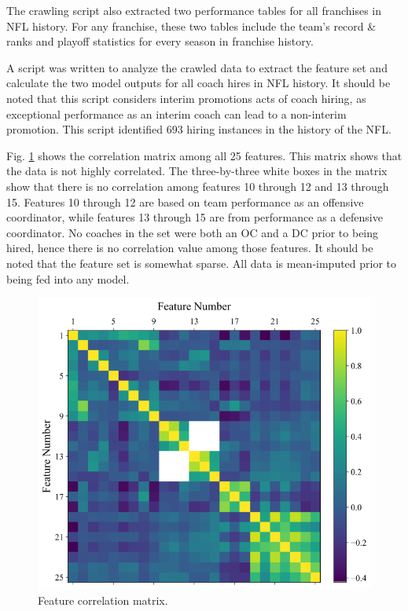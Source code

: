 \documentclass[conference]{IEEEtran}
\begin{document}
The crawling script also extracted two performance tables for all franchises in NFL history. For any franchise, these two tables include the team's record \& ranks and playoff statistics for every season in franchise history.

A script was written to analyze the crawled data to extract the feature set and calculate the two model outputs for all coach hires in NFL history. It should be noted that this script considers interim promotions acts of coach hiring, as exceptional performance as an interim coach can lead to a non-interim promotion. This script identified 693 hiring instances in the history of the NFL.

Fig. \ref{fig1} shows the correlation matrix among all 25 features. This matrix shows that the data is not highly correlated. The three-by-three white boxes in the matrix show that there is no correlation among features 10 through 12 and 13 through 15. Features 10 through 12 are based on team performance as an offensive coordinator, while features 13 through 15 are from performance as a defensive coordinator. No coaches in the set were both an OC and a DC prior to being hired, hence there is no correlation value among those features. It should be noted that the feature set is somewhat sparse. All data is mean-imputed prior to being fed into any model.

\begin{figure}[htbp]
\centerline{\includegraphics[width=1\linewidth]{corr.png}}
\caption{Feature correlation matrix.}
\label{fig1}
\end{figure}
\end{document}
